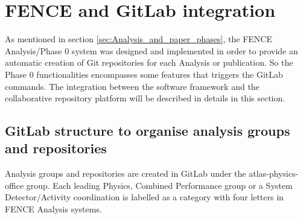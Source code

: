 
\section{FENCE and GitLab integration}%
\label{sec:FENCE_and_Gitlab_integration}

As mentioned in section \cref{sec:Analysis_and_paper_phases}, the FENCE Analysis/Phase 0 system was designed and implemented in order to provide an automatic creation of Git repositories for each Analysis or publication. So the Phase 0 functionalities encompasses some features that triggers the GitLab commands. The integration between the software framework and the collaborative repository  platform will be described in details in this section.

\subsection{GitLab structure to organise analysis groups and repositories}%
\label{sec:Gitlab_structure_to_organise_Analysis_groups_and_repositories}

Analysis groups and repositories are created in GitLab under the atlas-physics-office group. Each leading Physics, Combined Performance group or a System Detector/Activity coordination is labelled as a category with four letters in FENCE Analysis systems.

